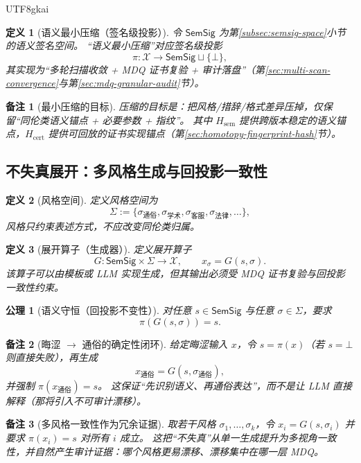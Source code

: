\documentclass[12pt]{article}
\newtheorem{definition}{定义}[section]
\newtheorem{axiom}{公理}[section]
\newtheorem{remark}{备注}[section]
\begin{document}
\begin{CJK*}{UTF8}{gkai}
\begin{definition}[语义最小压缩（签名级投影）]
令 $\mathsf{SemSig}$ 为第\ref{subsec:semsig-space}小节的语义签名空间。
“语义最小压缩”对应签名级投影
\[
\pi:\mathcal{X}\to \mathsf{SemSig}\sqcup\{\bot\},
\]
其实现为“多轮扫描收敛 + MDQ 证书复验 + 审计落盘”（第\ref{sec:multi-scan-convergence}与第\ref{sec:mdq-granular-audit}节）。
\end{definition}

\begin{remark}[最小压缩的目标]
压缩的目标是：把风格/措辞/格式差异压掉，仅保留“同伦类语义锚点 + 必要参数 + 指纹”。
其中 $H_{\mathrm{sem}}$ 提供跨版本稳定的语义锚点，$H_{\mathrm{cert}}$ 提供可回放的证书实现锚点（第\ref{sec:homotopy-fingerprint-hash}节）。
\end{remark}

\subsection{不失真展开：多风格生成与回投影一致性}
\label{subsec:lossless-expansion}

\begin{definition}[风格空间]
定义风格空间为
\[
\Sigma:=\{\sigma_{\text{通俗}},\sigma_{\text{学术}},\sigma_{\text{客服}},\sigma_{\text{法律}},\ldots\},
\]
风格只约束表述方式，不应改变同伦类归属。
\end{definition}

\begin{definition}[展开算子（生成器）]
定义展开算子
\[
G:\mathsf{SemSig}\times \Sigma\to \mathcal{X},
\qquad
x_{\sigma}=G(s,\sigma).
\]
该算子可以由模板或 LLM 实现生成，但其输出必须受 MDQ 证书复验与回投影一致性约束。
\end{definition}

\begin{axiom}[语义守恒（回投影不变性）]
\label{ax:projection-invariance}
对任意 $s\in\mathsf{SemSig}$ 与任意 $\sigma\in\Sigma$，要求
\[
\pi(G(s,\sigma))=s.
\]
\end{axiom}

\begin{remark}[晦涩 $\to$ 通俗的确定性闭环]
给定晦涩输入 $x$，令 $s=\pi(x)$（若 $s=\bot$ 则直接失败），再生成
\[
x_{\text{通俗}}=G(s,\sigma_{\text{通俗}}),
\]
并强制 $\pi(x_{\text{通俗}})=s$。
这保证“先识别语义、再通俗表达”，而不是让 LLM 直接解释（那将引入不可审计漂移）。
\end{remark}

\begin{remark}[多风格一致性作为冗余证据]
取若干风格 $\sigma_1,\ldots,\sigma_k$，令 $x_i=G(s,\sigma_i)$ 并要求 $\pi(x_i)=s$ 对所有 $i$ 成立。
这把“不失真”从单一生成提升为多视角一致性，并自然产生审计证据：哪个风格更易漂移、漂移集中在哪一层 MDQ。
\end{remark}


\end{CJK*}
\end{document}
